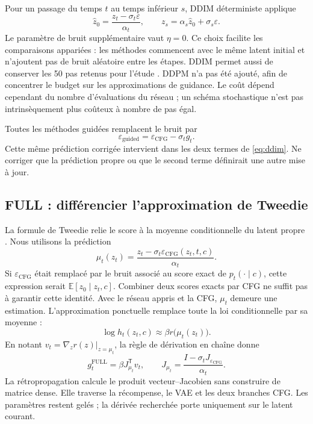 \documentclass[11pt,a4paper]{article}
\newcommand{\E}{\mathbb{E}}
\begin{document}
Pour un passage du temps $t$ au temps inférieur $s$, DDIM déterministe applique
\begin{equation}\label{eq:ddim}
\widehat z_0=\frac{z_t-\sigma_t\varepsilon}{\alpha_t},
\qquad z_s=\alpha_s\widehat z_0+\sigma_s\varepsilon.
\end{equation}
Le paramètre de bruit supplémentaire vaut $\eta=0$. Ce choix facilite les comparaisons appariées : les méthodes commencent avec le même latent initial et n'ajoutent pas de bruit aléatoire entre les étapes. DDIM permet aussi de conserver les 50 pas retenus pour l'étude \cite{ddim}. DDPM n'a pas été ajouté, afin de concentrer le budget sur les approximations de guidance. Le coût dépend cependant du nombre d'évaluations du réseau ; un schéma stochastique n'est pas intrinsèquement plus coûteux à nombre de pas égal.

Toutes les méthodes guidées remplacent le bruit par
\begin{equation}\label{eq:noise}
\varepsilon_{\mathrm{guided}}=\varepsilon_{\mathrm{CFG}}-\sigma_tg_t.
\end{equation}
Cette même prédiction corrigée intervient dans les deux termes de \eqref{eq:ddim}. Ne corriger que la prédiction propre ou que le second terme définirait une autre mise à jour.

\subsection{FULL : différencier l'approximation de Tweedie}
La formule de Tweedie relie le score à la moyenne conditionnelle du latent propre \cite{efron}. Nous utilisons la prédiction
\begin{equation}\label{eq:mu}
\mu_t(z_t)=\frac{z_t-\sigma_t\varepsilon_{\mathrm{CFG}}(z_t,t,c)}{\alpha_t}.
\end{equation}
Si $\varepsilon_{\mathrm{CFG}}$ était remplacé par le bruit associé au score exact de $p_t(\cdot\mid c)$, cette expression serait $\E[z_0\mid z_t,c]$. Combiner deux scores exacts par CFG ne suffit pas à garantir cette identité. Avec le réseau appris et la CFG, $\mu_t$ demeure une estimation. L'approximation ponctuelle remplace toute la loi conditionnelle par sa moyenne :
\begin{equation}\label{eq:tweedie}
\log h_t(z_t,c)\approx\beta r\bigl(\mu_t(z_t)\bigr).
\end{equation}
En notant $v_t=\nabla_zr(z)|_{z=\mu_t}$, la règle de dérivation en chaîne donne
\begin{equation}\label{eq:full}
g_t^{\mathrm{FULL}}=\beta J_{\mu_t}^{\mathsf T}v_t,
\qquad J_{\mu_t}=\frac{I-\sigma_tJ_{\varepsilon_{\mathrm{CFG}}}}{\alpha_t}.
\end{equation}
La rétropropagation calcule le produit vecteur--Jacobien sans construire de matrice dense. Elle traverse la récompense, le VAE et les deux branches CFG. Les paramètres restent gelés ; la dérivée recherchée porte uniquement sur le latent courant.
\end{document}
